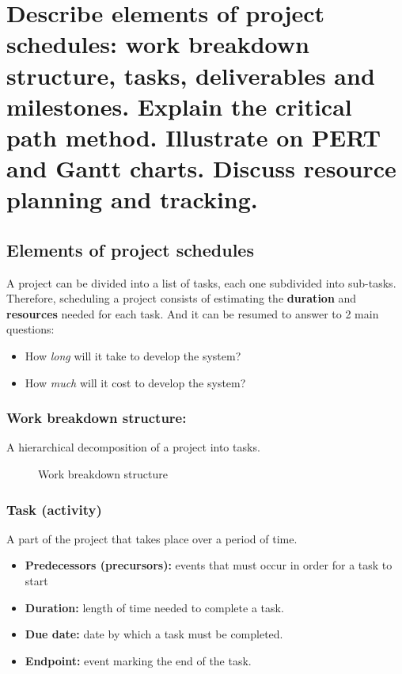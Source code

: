 \clearpage{}
\section{Describe elements of project schedules: work breakdown structure,
tasks, deliverables and milestones. Explain the critical path method.
Illustrate on PERT and Gantt charts. Discuss resource planning and
tracking.}

\subsection{Elements of project schedules}
A project can be divided into a list of tasks, each one subdivided into sub-tasks. Therefore, scheduling a project consists of estimating the \textbf{duration} and \textbf{resources} needed for each task. And it can be resumed to answer to 2 main questions:
\begin{itemize}
	\item How \textit{long} will it take to develop the system?
	\item How \textit{much} will it cost to develop the system?
\end{itemize}

\subsubsection{Work breakdown structure:}
A hierarchical decomposition of a project into tasks.
\begin{figure}[!ht]
    \centering
    
    \caption{Work breakdown structure}
\end{figure}

\subsubsection{Task (activity)}
A part of the project that takes place over a period of time.
\begin{itemize}
    \item \textbf{Predecessors (precursors):} events that must occur in order for a
    task to start
    \item \textbf{Duration:} length of time needed to complete a task.
    \item \textbf{Due date:} date by which a task must be completed.
    \item \textbf{Endpoint:} event marking the end of the task.
\end{itemize}


